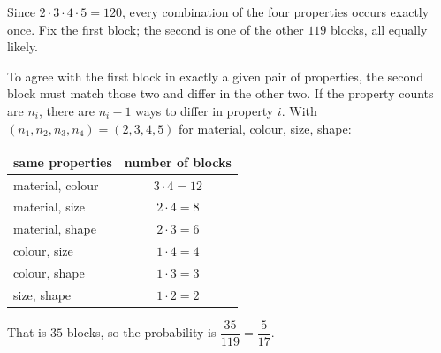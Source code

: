 Since $2\cdot3\cdot4\cdot5=120$, every combination of the four properties occurs exactly once. Fix the first block; the second is one of the other $119$ blocks, all equally likely.

To agree with the first block in exactly a given pair of properties, the second block must match those two and differ in the other two. If the property counts are $n_i$, there are $n_i-1$ ways to differ in property $i$. With $(n_1,n_2,n_3,n_4)=(2,3,4,5)$ for material, colour, size, shape:
\begin{center}
\begin{tabular}{lc}
same properties & number of blocks\\ \hline
material, colour & $3\cdot4=12$\\
material, size & $2\cdot4=8$\\
material, shape & $2\cdot3=6$\\
colour, size & $1\cdot4=4$\\
colour, shape & $1\cdot3=3$\\
size, shape & $1\cdot2=2$
\end{tabular}
\end{center}
That is $35$ blocks, so the probability is $\dfrac{35}{119}=\boxed{\dfrac{5}{17}}$.
